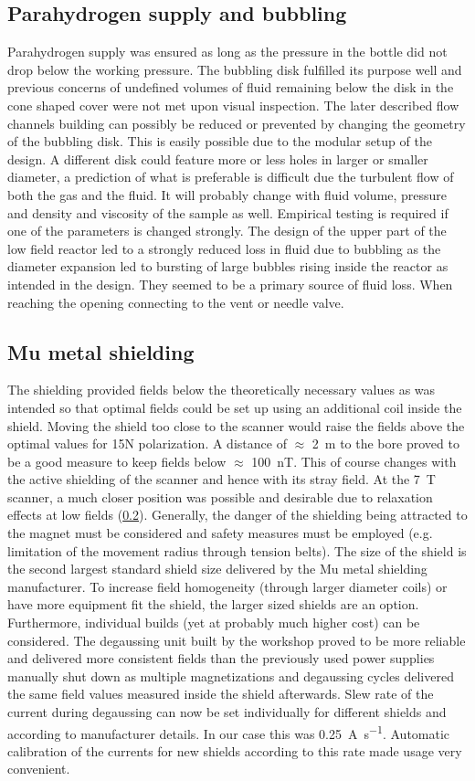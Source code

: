         \subsection{Parahydrogen supply and bubbling}
            Parahydrogen supply was ensured as long as the pressure in the bottle did not drop below the working pressure. The bubbling disk fulfilled its purpose well and previous concerns of undefined volumes of fluid remaining below the disk in the cone shaped cover were not met upon visual inspection. The later described flow channels building can possibly be reduced or prevented by changing the geometry of the bubbling disk. This is easily possible due to the modular setup of the design. A different disk could feature more or less holes in larger or smaller diameter, a prediction of what is preferable is difficult due the turbulent flow of both the gas and the fluid. It will probably change with fluid volume, pressure and density and viscosity of the sample as well. Empirical testing is required if one of the parameters is changed strongly.
            The design of the upper part of the low field reactor led to a strongly reduced loss in fluid due to bubbling as the diameter expansion led to bursting of large bubbles rising inside the reactor as intended in the design. They seemed to be a primary source of fluid loss. When reaching the opening connecting to the vent or needle valve.
        \subsection{Mu metal shielding}
            The shielding provided fields below the theoretically necessary values as was intended so that optimal fields could be set up using an additional coil inside the shield. Moving the shield too close to the scanner would raise the fields above the optimal values for 15N polarization. A distance of $\approx$ \SI{2}{\meter} to the bore proved to be a good measure to keep fields below $\approx$ \SI{100}{\nano\tesla}. This of course changes with the active shielding of the scanner and hence with its stray field. At the \SI{7}{\tesla} scanner, a much closer position was possible and desirable due to relaxation effects at low fields (\ref{}). Generally, the danger of the shielding being attracted to the magnet must be considered and safety measures must be employed (e.g. limitation of the movement radius through tension belts). The size of the shield is the second largest standard shield size delivered by the Mu metal shielding manufacturer. To increase field homogeneity (through larger diameter coils) or have more equipment fit the shield, the larger sized shields are an option. Furthermore, individual builds (yet at probably much higher cost) can be considered.
            The degaussing unit built by the workshop proved to be more reliable and delivered more consistent fields than the previously used power supplies manually shut down as multiple magnetizations and degaussing cycles delivered the same field values measured inside the shield afterwards. Slew rate of the current during degaussing can now be set individually for different shields and according to manufacturer details. In our case this was \SI{0.25}{\ampere\per\second}. Automatic calibration of the currents for new shields according to this rate made usage very convenient.
